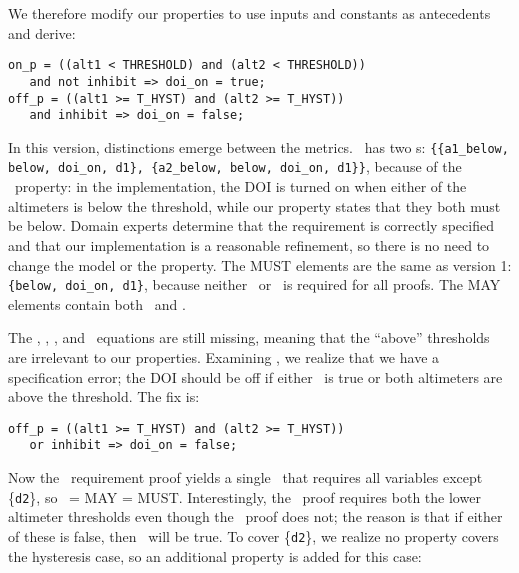 We therefore modify our properties to use inputs and constants as antecedents and derive:

{\smaller
\begin{verbatim}
on_p = ((alt1 < THRESHOLD) and (alt2 < THRESHOLD))
   and not inhibit => doi_on = true;
off_p = ((alt1 >= T_HYST) and (alt2 >= T_HYST))
   and inhibit => doi_on = false;
\end{verbatim}
}

\noindent In this version, distinctions emerge between the metrics.  \allp\ has two \mivc s: \texttt{\{\{a1\_below, below, doi\_on, d1\}, \{a2\_below, below, doi\_on, d1\}\}}, because of the \onp\ property: in the implementation, the DOI is turned on when either of the altimeters is below the threshold, while our property states that they both must be below.
Domain experts determine that the requirement is correctly specified and that our implementation is a reasonable refinement, so there is no need to change the model or the property.  The MUST elements are the same as version 1: \texttt{\{below, doi\_on, d1\}}, because neither \aonebelow\ or \atwobelow\ is required for all proofs.  %
The MAY elements contain both \aonebelow\ and \atwobelow.

The \abovehyst, \aoneabove, \atwoabove, and \dtwo\ equations are still missing, meaning that the ``above'' thresholds are irrelevant to our properties.  Examining \offp, we realize that we have a specification error; the DOI should be off if either \inhibit\ is true or both altimeters are above the threshold. The fix is:

{\smaller
\begin{verbatim}
off_p = ((alt1 >= T_HYST) and (alt2 >= T_HYST))
   or inhibit => doi_on = false;
\end{verbatim}
}

\noindent Now the \allp\ requirement proof yields a single \mivc ~that requires all variables except \{\texttt{d2}\}, so \mivc ~= MAY = MUST.  Interestingly, the \offp\ proof requires both the lower altimeter thresholds even though the \onp\ proof does not; the reason is that if either of these is false, then \doion\ will be true.  To cover \{\texttt{d2}\}, we realize no property covers the hysteresis case, so an additional property is added for this case:

